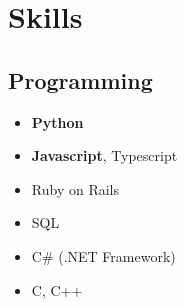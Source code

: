 \documentclass[]{resume}
\begin{document}
\begin{minipage}[t]{0.28\textwidth}


\section{Skills}

\subsection{Programming}
\begin{itemize}[leftmargin=*]
    \itemsep0pt \parskip0pt 
    \item{\textbf{Python}}
    \item{\textbf{Javascript}, Typescript}
    \item{Ruby on Rails}
    \item{SQL}
    \item{C\# (.NET Framework)}
    \item{C, C++}
\end{itemize}


\end{minipage}
\end{document}
